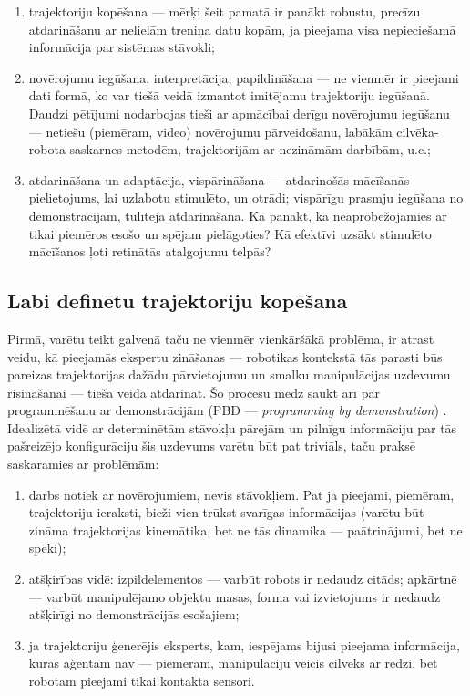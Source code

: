 \documentclass[12pt, a4paper]{article}
\numberwithin{equation}{section} %
\begin{document}
\begin{enumerate}
    \item trajektoriju kopēšana --- mērķi šeit pamatā ir panākt robustu, precīzu atdarināšanu ar nelielām treniņa datu kopām, ja pieejama visa nepieciešamā informācija par sistēmas stāvokli;
    \item novērojumu iegūšana, interpretācija, papildināšana --- ne vienmēr ir pieejami dati formā, ko var tiešā veidā izmantot imitējamu trajektoriju iegūšanā. Daudzi pētījumi nodarbojas tieši ar apmācībai derīgu novērojumu iegūšanu --- netiešu (piemēram, video) novērojumu pārveidošanu, labākām cilvēka-robota saskarnes metodēm, trajektorijām ar nezināmām darbībām, u.c.;
    \item atdarināšana un adaptācija, vispārināšana --- atdarinošās mācīšanās pielietojums, lai uzlabotu stimulēto, un otrādi; vispārīgu prasmju iegūšana no demonstrācijām, tūlītēja atdarināšana. Kā panākt, ka neaprobežojamies ar tikai piemēros esošo un spējam pielāgoties? Kā efektīvi uzsākt stimulēto mācīšanos ļoti retinātās atalgojumu telpās?
\end{enumerate}

\subsection{Labi definētu trajektoriju kopēšana}

Pirmā, varētu teikt galvenā taču ne vienmēr vienkāršākā problēma, ir atrast veidu, kā pieejamās ekspertu zināšanas --- robotikas kontekstā tās parasti būs pareizas trajektorijas dažādu pārvietojumu un smalku manipulācijas uzdevumu risināšanai --- tiešā veidā atdarināt. Šo procesu mēdz saukt arī par programmēšanu ar demonstrācijām (PBD --- \textit{programming by demonstration}) \cite{muench1994robot,billard2008handbook}. Idealizētā vidē ar determinētām stāvokļu pārejām un pilnīgu informāciju par tās pašreizējo konfigurāciju šis uzdevums varētu būt pat triviāls, taču praksē saskaramies ar problēmām:

\begin{enumerate}
    \item darbs notiek ar novērojumiem, nevis stāvokļiem. Pat ja pieejami, piemēram, trajektoriju ieraksti, bieži vien trūkst svarīgas informācijas (varētu būt zināma trajektorijas kinemātika, bet ne tās dinamika --- paātrinājumi, bet ne spēki);
    \item atšķirības vidē: izpildelementos --- varbūt robots ir nedaudz citāds; apkārtnē --- varbūt manipulējamo objektu masas, forma vai izvietojums ir nedaudz atšķirīgi no demonstrācijās esošajiem;
    \item ja trajektoriju ģenerējis eksperts, kam, iespējams bijusi pieejama informācija, kuras aģentam nav --- piemēram, manipulāciju veicis cilvēks ar redzi, bet robotam pieejami tikai kontakta sensori.
\end{enumerate}
\end{document}
